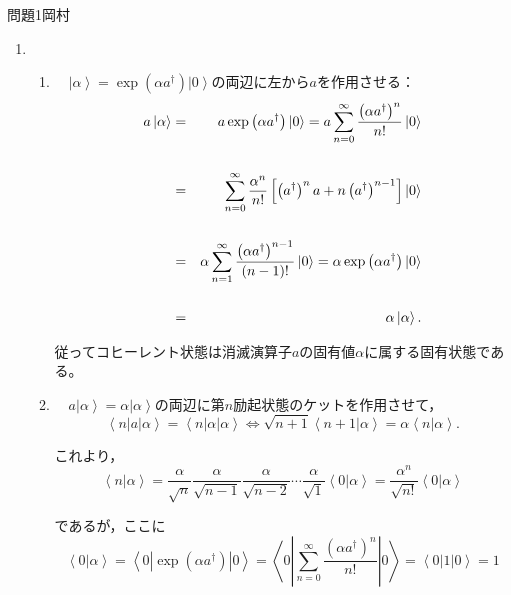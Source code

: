 \documentclass[fleqn]{jbook}
\begin{document}
\begin{answer}{問題1}{岡村}
\begin{enumerate}
  \item 　
  \begin{enumerate}
    \item 　$\left| \alpha  \right\rangle  = \exp \left( {\alpha a^{\dagger} } \right)\left| 0 \right\rangle$の両辺に左から$a$を作用させる：
    \begin{eqnarray}
  a\left| \alpha  \right\rangle  &=& a\exp \left( {\alpha a^{\dagger} } \right)\left| 0 \right\rangle  = a\sum\limits_{n = 0}^\infty  {\frac{{\left( {\alpha a^{\dagger} } \right)^n }}{{n!}}} \left| 0 \right\rangle  \cr 
  & & \cr
   &=& \sum\limits_{n = 0}^\infty  {\frac{{\alpha ^n }}{{n!}}\left[ {\left( {a^{\dagger} } \right)^n a + n\left( {a^{\dagger} } \right)^{n - 1} } \right]} \left| 0 \right\rangle  \cr 
   & & \cr
   &=& \alpha \sum\limits_{n = 1}^\infty  {\frac{{\left( {\alpha a^{\dagger} } \right)^{n - 1} }}{{\left( {n - 1} \right)!}}} \left| 0 \right\rangle  = \alpha \exp \left( {\alpha a^{\dagger} } \right)\left| 0 \right\rangle  \cr 
   & & \cr
   &=& \alpha \left| \alpha  \right\rangle .
    \end{eqnarray}
    
    従ってコヒーレント状態は消滅演算子$a$の固有値$\alpha$に属する固有状態である。\\
    
    \item 　$a\left| \alpha  \right\rangle  = \alpha \left| \alpha  \right\rangle $の両辺に第$n$励起状態のケットを作用させて，
    \begin{equation}
\left\langle {n\left| a \right|\alpha } \right\rangle  = \left\langle {n\left| \alpha  \right|\alpha } \right\rangle  \iff \sqrt {n + 1} \left\langle {{n + 1}}|{\alpha } \right\rangle  = \alpha \left\langle {n}|{\alpha } \right\rangle . 
    \end{equation}
    
 これより，
 \begin{equation}
\left\langle {n}|{\alpha } \right\rangle  = \frac{\alpha }{{\sqrt n }}\frac{\alpha }{{\sqrt {n - 1} }}\frac{\alpha }{{\sqrt {n - 2} }} \cdots \frac{\alpha }{{\sqrt 1 }}\left\langle {0}|{\alpha } \right\rangle  = \frac{{\alpha ^n }}{{\sqrt {n!} }}\left\langle {0}|{\alpha } \right\rangle  
 \end{equation}
 
 であるが，ここに
 \begin{equation}
 \left\langle {0}|{\alpha } \right\rangle  = \left\langle {0\left| {\exp \left( {\alpha a^{\dagger} } \right)} \right|0} \right\rangle  = \left\langle {0\left| {\sum\limits_{n = 0}^\infty  {\frac{{\left( {\alpha a^{\dagger} } \right)^n }}{{n!}}} } \right|0} \right\rangle  = \left\langle {0\left| 1 \right|0} \right\rangle  = 1 
 \end{equation}
 

\end{enumerate}
\end{enumerate}
\end{answer}
\end{document}
